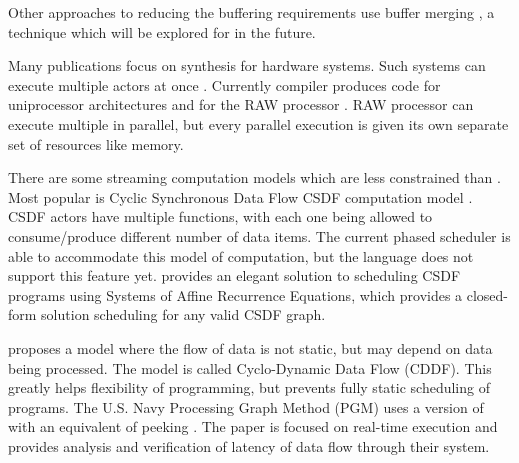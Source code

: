 Other approaches to reducing the buffering requirements use buffer
merging \cite{murthy99buffer}, a technique which will be explored
for {\StreamIt} in the future.

Many publications focus on synthesis for hardware systems.  Such
systems can execute multiple actors at once
\cite{govindarajan-minimizing}.  Currently {\StreamIt} compiler
produces code for uniprocessor architectures \cite{streamittech2}
and for the RAW processor \cite{gordo-thesis}.  RAW processor can
execute multiple {\filters} in parallel, but every parallel
execution is given its own separate set of resources like memory.

There are some streaming computation models which are less
constrained than {\SDF}. Most popular is Cyclic Synchronous Data Flow
CSDF computation model \cite{parks95comparison}.  CSDF actors have
multiple {\work} functions, with each one being allowed to
consume/produce different number of data items. The current
{\StreamIt} phased scheduler is able to accommodate this model of
computation, but the {\StreamIt} language does not support this
feature yet. \cite{streamittech3} provides an elegant solution to
scheduling CSDF programs using Systems of Affine Recurrence
Equations, which provides a closed-form solution scheduling for
any valid CSDF graph.

\cite{wauters96cyclodynamic} proposes a model where the flow of
data is not static, but may depend on data being processed. The
model is called Cyclo-Dynamic Data Flow (CDDF). This greatly helps
flexibility of programming, but prevents fully static scheduling
of programs. The U.S. Navy Processing Graph Method (PGM) uses a
version of {\SDF} with an equivalent of peeking \cite{goddard00navy}.
The paper is focused on real-time execution and provides analysis
and verification of latency of data flow through their system.

